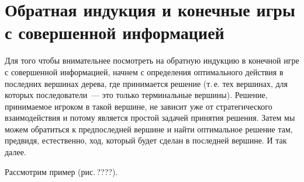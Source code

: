 \documentclass[12pt]{book}
\begin{document}
\newcommand{\be}{\begin{equation}}
\newcommand{\ee}{\end{equation}}
\renewcommand{\theequation}{\arabic{equation}}

\newcommand {\SC}{\succcurlyeq}
\newcommand {\GT}{\gtrsim}
\newcommand {\PR}{\precsim}
\newcommand {\UC}{\succsim}

\newcommand{\R}{{\rm I\!R}}
\newcommand{\B}{\hbox{\ms B}}
\newcommand{\Z}{\hbox{\ms Z}}

\newcommand{\bc}{\begin{center}}
\newcommand{\ec}{\end{center}}




\newtheorem{theorem}{Теорема}
\newtheorem{lemma}{Лемма}
\newtheorem{corollary}{Следствие}
\newtheorem{definition}{Определение}
\newtheorem{proposition}{Предложение}


\makeatletter
{}
\makeatother

\renewcommand{\thesection}{\arabic{section}.}



\section{Обратная индукция и конечные игры с совершенной информацией}

Для того чтобы внимательнее посмотреть на обратную индукцию в
конечной игре с совершенной информацией, начнем с определения
оптимального действия в последних вершинах дерева, где принимается
решение (т.\,е. тех вершинах, для которых последователи~--- это
только терминальные вершины). Решение, принимаемое игроком в такой
вершине, не зависит уже от стратегического взаимодействия и потому
является простой задачей принятия решения. Затем мы можем обратиться
к предпоследней  вершине и найти оптимальное решение там, предвидя,
естественно, ход, который будет сделан в последней вершине. И так
далее.

Рассмотрим пример (рис.\,????).
\end{document}
